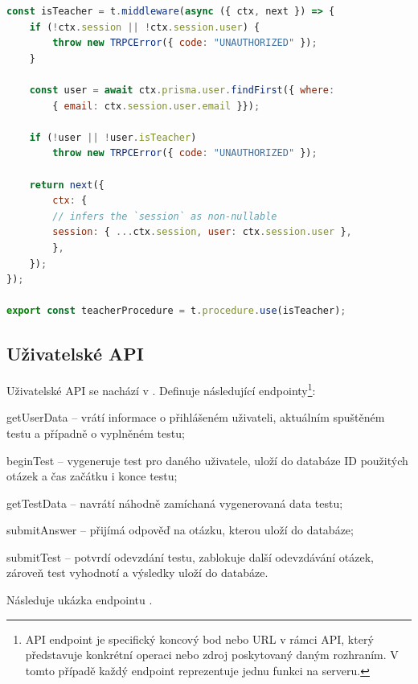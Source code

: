 \begin{lstlisting}[language=JavaScript,caption={Úryvek \M{/src/server/trpc/trpc.ts}; kontrola přístupu do učitelského rozhraní.}]
const isTeacher = t.middleware(async ({ ctx, next }) => {
    if (!ctx.session || !ctx.session.user) {
        throw new TRPCError({ code: "UNAUTHORIZED" });
    }
    
    const user = await ctx.prisma.user.findFirst({ where: 
        { email: ctx.session.user.email }});

    if (!user || !user.isTeacher)
        throw new TRPCError({ code: "UNAUTHORIZED" });
    
    return next({
        ctx: {
        // infers the `session` as non-nullable
        session: { ...ctx.session, user: ctx.session.user },
        },
    });
});

export const teacherProcedure = t.procedure.use(isTeacher);
\end{lstlisting}

\subsection{Uživatelské API}
\label{userapi}

Uživatelské API se nachází v . Definuje následující endpointy\footnote{API endpoint je specifický koncový bod nebo URL v rámci API, který představuje konkrétní operaci nebo zdroj poskytovaný daným rozhraním. V tomto případě každý endpoint reprezentuje jednu funkci na serveru.}:

\begin{compactitem}
    \item getUserData -- vrátí informace o přihlášeném uživateli, aktuálním spuštěném testu a případně o vyplněném testu;
    \item beginTest -- vygeneruje test pro daného uživatele, uloží do databáze ID použitých otázek a čas začátku i konce testu;
    \item getTestData -- navrátí náhodně zamíchaná vygenerovaná data testu;
    \item submitAnswer -- přijímá odpověď na otázku, kterou uloží do databáze;
    \item submitTest -- potvrdí odevzdání testu, zablokuje další odevzdávání otázek, zároveň test vyhodnotí a výsledky uloží do databáze.
\end{compactitem}

Následuje ukázka endpointu .

